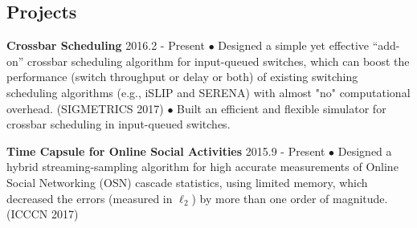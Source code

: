\documentclass[line,11pt,letter]{/Users/longgong/Dropbox/git-reps/easy_cv/includes/cls/myRes}
\begin{document}
\begin{resume}
\section{Projects}
\vspace{-4pt}
{\setlength{\parskip}{0pt}
{\bf Crossbar Scheduling} \hfill 2016.2 - Present\break
{\hspace*{1em} $\bullet$ Designed a simple yet effective ``add-on'' crossbar scheduling algorithm for input-queued switches, which can boost the performance (switch throughput or delay or both) of existing switching scheduling algorithms (e.g., iSLIP and SERENA) with almost "no" computational overhead. (SIGMETRICS 2017)\hfill\break}
{\hspace*{1em} $\bullet$ Built an efficient and flexible simulator for crossbar scheduling in input-queued switches.\hfill\break}
\sspace

}
{\setlength{\parskip}{0pt}
{\bf Time Capsule for Online Social Activities} \hfill 2015.9 - Present\break
{\hspace*{1em} $\bullet$ Designed a hybrid streaming-sampling algorithm for high accurate measurements of Online Social Networking (OSN) cascade statistics, using limited memory, which decreased the errors (measured in $\ell_2$) by more than one order of magnitude. (ICCCN 2017)\hfill\break}
}
\negspace

\end{resume}
\end{document}
